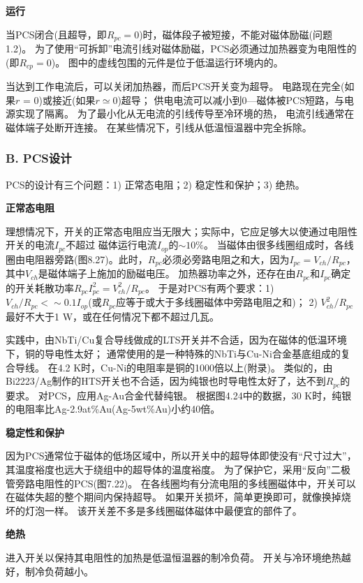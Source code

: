 \textbf{运行}

当PCS闭合(且超导，即$R_{pc} = 0$)时，磁体段子被短接，不能对磁体励磁(问题1.2)。
为了使用“可拆卸”电流引线对磁体励磁，PCS必须通过加热器变为电阻性的(即$R_{cp} = 0$)。
图中的虚线包围的元件是位于低温运行环境内的。

当达到工作电流后，可以关闭加热器，而后PCS开关变为超导。
电路现在完全(如果$r$ = 0)或接近(如果$r\simeq 0$)超导；
供电电流可以减小到0---磁体被PCS短路，与电源实现了隔离。
为了最小化从无电流的引线传导至冷环境的热，
电流引线通常在磁体端子处断开连接。
 在某些情况下，引线从低温恒温器中完全拆除。

\subsubsection*{B. PCS设计}
PCS的设计有三个问题：1) 正常态电阻；2) 稳定性和保护；3) 绝热。

\textbf{正常态电阻}

理想情况下，开关的正常态电阻应当无限大；实际中，它应足够大以使通过电阻性开关的电流$I_{pc}$不超过
磁体运行电流$I_{op}$的$\sim 10\%$。
当磁体由很多线圈组成时，各线圈由电阻器旁路(图8.27)。此时，$R_{pc}$必须必旁路电阻之和大，因为$I_{pc}=V_{ch}/R_{pc}$，
其中$V_{ch}$是磁体端子上施加的励磁电压。
加热器功率之外，还存在由$R_{pc}$和$I_{pc}$确定的开关耗散功率$R_{pc}I_{pc}^2=V_{ch}^2/R_{pc}$。
于是对PCS有两个要求：1) $V_{ch}/R_{pc}<\sim 0.1 I_{op}$(或$R_{pc}$应等于或大于多线圈磁体中旁路电阻之和)；
2) $V_{ch}^2/R_{pc}$最好不大于1 W，或在任何情况下都不超过几瓦。

实践中，由NbTi/Cu复合导线做成的LTS开关并不合适，因为在磁体的低温环境下，铜的导电性太好；
通常使用的是一种特殊的NbTi与Cu-Ni合金基底组成的复合导线。
在4.2 K时，Cu-Ni的电阻率是铜的1000倍以上(附录)。
类似的，由Bi2223/Ag制作的HTS开关也不合适，因为纯银也时导电性太好了，达不到$R_{pc}$的要求。
对PCS，应用Ag-Au合金代替纯银。
根据图4.24中的数据，30 K时，纯银的电阻率比Ag-2.9at\%Au(Ag-5wt\%Au)小约40倍。

\textbf{稳定性和保护}

因为PCS通常位于磁体的低场区域中，所以开关中的超导体即使没有“尺寸过大”，
其温度裕度也远大于绕组中的超导体的温度裕度。
为了保护它，采用“反向”二极管旁路电阻性的PCS(图7.22)。
在各线圈均有分流电阻的多线圈磁体中，开关可以在磁体失超的整个期间内保持超导。
如果开关损坏，简单更换即可，就像换掉烧坏的灯泡一样。
该开关差不多是多线圈磁体磁体中最便宜的部件了。

\textbf{绝热}

进入开关以保持其电阻性的加热是低温恒温器的制冷负荷。
开关与冷环境绝热越好，制冷负荷越小。

